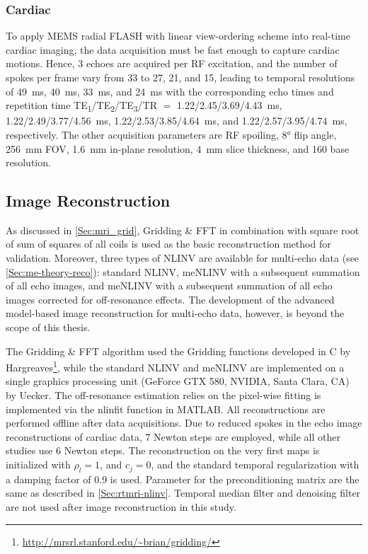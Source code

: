 \subsubsection*{Cardiac}
To apply MEMS radial FLASH with linear view-ordering scheme into real-time cardiac imaging, the data acquisition must be fast enough to capture cardiac motions. Hence, \num{3} echoes are acquired per RF excitation, and the number of spokes per frame vary from \num{33} to \num{27}, \num{21}, and \num{15}, leading to temporal resolutions of \SI{49}{\ms}, \SI{40}{\ms}, \SI{33}{\ms}, and \SI{24}{\ms} with the corresponding echo times and repetition time TE\textsubscript{\num{1}}/TE\textsubscript{\num{2}}/TE\textsubscript{\num{3}}/TR $=$ \num{1.22}/\num{2.45}/\num{3.69}/\SI{4.43}{\ms}, \num{1.22}/\num{2.49}/\num{3.77}/\SI{4.56}{\ms}, \num{1.22}/\num{2.53}/\num{3.85}/\SI{4.64}{\ms}, and \num{1.22}/\num{2.57}/\num{3.95}/\SI{4.74}{\ms}, respectively. The other acquisition parameters are RF spoiling, \ang{8} flip angle, \SI{256}{\mm} FOV, \SI{1.6}{\mm} in-plane resolution, \SI{4}{\mm} slice thickness, and \num{160} base resolution.

\subsection{Image Reconstruction}
As discussed in \cref{Sec:mri_grid}, Gridding \& FFT in combination with square root of sum of squares of all coils is used as the basic reconstruction method for validation. Moreover, three types of NLINV are available for multi-echo data (see \cref{Sec:me-theory-reco}): standard NLINV,  meNLINV with a subsequent summation of all echo images, and meNLINV with a subsequent summation of all echo images corrected for off-resonance effects. The development of the advanced model-based image reconstruction for multi-echo data, however, is beyond the scope of this thesis.

The Gridding \& FFT algorithm used the Gridding functions developed in C by Hargreaves\footnote{\url{http://mrsrl.stanford.edu/~brian/gridding/}}, while the standard NLINV and meNLINV are implemented on a single graphics processing unit (GeForce GTX \num{580}, NVIDIA, Santa Clara, CA) by Uecker. The off-resonance estimation relies on the pixel-wise fitting is implemented via the nlinfit function in MATLAB. All reconstructions are performed offline after data acquisitions. Due to reduced spokes in the echo image reconstructions of cardiac data, \num{7} Newton steps are employed, while all other studies use \num{6} Newton steps. The reconstruction on the very first maps is initialized with $\rho_l = 1$, and $c_j = 0$, and the standard temporal regularization with a damping factor of \num{0.9} is used. Parameter for the preconditioning matrix are the same as described in \cref{Sec:rtmri-nlinv}. Temporal median filter and denoising filter are not used after image reconstruction in this study.


